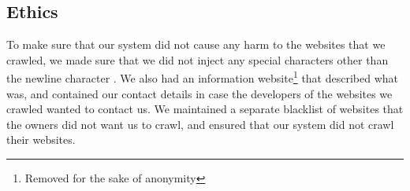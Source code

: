 \subsection{Ethics}
To make sure that our system did not cause any harm to the websites that we crawled, we made sure that we did not inject any special characters other than the newline character%
. We also had an information website\footnote{Removed for the sake of anonymity} that described what \ehi was, and contained our contact details in case the developers of the websites we crawled wanted to contact us. We maintained a separate blacklist of websites that the owners did not want us to crawl, and ensured that our system did not crawl their websites.